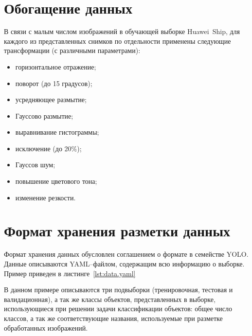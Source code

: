 


\section{Обогащение данных}

В связи с малым числом изображений в обучающей выборке Huawei~Ship, для каждого из представленных снимков по отдельности применены следующие трансформации (с различными параметрами):
\begin{itemize}[label=---]
    \item горизонтальное отражение;
    \item поворот (до 15 градусов);
    \item усредняющее размытие;
    \item Гауссово размытие;
    \item выравнивание гистограммы;
    \item исключение (до 20\%);
    \item Гауссов шум;
    \item повышение цветового тона;
    \item изменение резкости.
\end{itemize}

\section{Формат хранения разметки данных}

Формат хранения данных обусловлен соглашением о формате в семействе YOLO. Данные описываются YAML--файлом, содержащим всю информацию о выборке. Пример приведен в листинге~\ref{lst:data.yaml} 


В данном примере описываются три подвыборки (тренировочная, тестовая и валидационная), а так же классы объектов, представленных в выборке, использующиеся при решении задачи классификации объектов: общее число классов, а так же соответствующие названия, используемые при разметке обработанных изображений.
 
